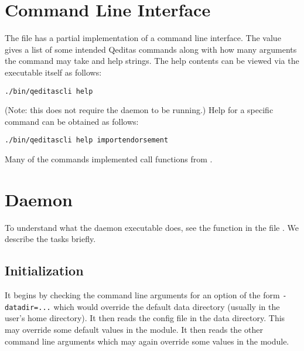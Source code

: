 \section{Command Line Interface}

The file {} has a partial implementation of a command line interface.
The value {} gives a list of some intended Qeditas commands
along with how many arguments the command may take and help strings.
The help contents can be viewed via the executable itself as follows:
\begin{verbatim}
./bin/qeditascli help
\end{verbatim}
(Note: this does not require the daemon to be running.)
Help for a specific command can be obtained as follows:
\begin{verbatim}
./bin/qeditascli help importendorsement
\end{verbatim}
Many of the commands implemented call functions from {}.

\section{Daemon} %

To understand what the daemon executable {} does,
see the function {} in the file {}.
We describe the tasks {} briefly.

\subsection{Initialization}

It begins by checking the command line arguments for an option
of the form \verb+-datadir=...+
which would override the default data directory (usually {}
in the user's home directory).
It then reads the config file {} in the data directory.
This may override some default values in the {} module.
It then reads the other command line arguments which may again override
some values in the {} module.

